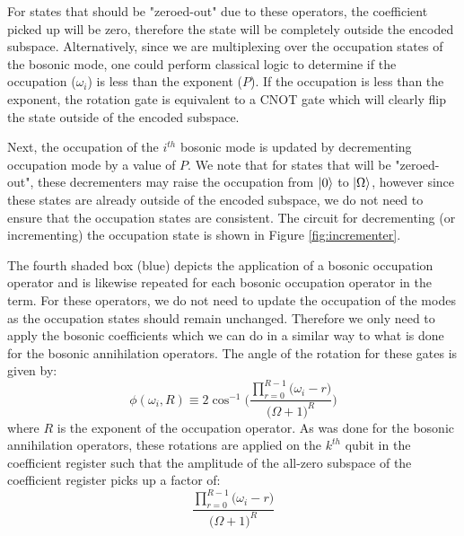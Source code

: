 For states that should be "zeroed-out" due to these operators, the coefficient picked up will be zero, therefore the state will be completely outside the encoded subspace.
Alternatively, since we are multiplexing over the occupation states of the bosonic mode, one could perform classical logic to determine if the occupation ($\omega_i$) is less than the exponent ($P$).
If the occupation is less than the exponent, the rotation gate is equivalent to a CNOT gate which will clearly flip the state outside of the encoded subspace.

Next, the occupation of the $i^{th}$ bosonic mode is updated by decrementing occupation mode by a value of $P$.
We note that for states that will be "zeroed-out", these decrementers may raise the occupation from $\ket{0}$ to $\ket{\Omega}$, however since these states are already outside of the encoded subspace, we do not need to ensure that the occupation states are consistent.
The circuit for decrementing (or incrementing) the occupation state is shown in Figure \ref{fig:incrementer}.

The fourth shaded box (blue) depicts the application of a bosonic occupation operator and is likewise repeated for each bosonic occupation operator in the term.
For these operators, we do not need to update the occupation of the modes as the occupation states should remain unchanged.
Therefore we only need to apply the bosonic coefficients which we can do in a similar way to what is done for the bosonic annihilation operators. 
The angle of the rotation for these gates is given by:
\begin{equation}
    \phi(\omega_i, R) \equiv 2 \cos^{-1}{\Big(\frac{\prod_{r=0}^{R-1} \big(\omega_i - r \big)}{\big(\Omega + 1\big)^R}\Big)}
\end{equation}
where $R$ is the exponent of the occupation operator.
As was done for the bosonic annihilation operators, these rotations are applied on the $k^{th}$ qubit in the coefficient register such that the amplitude of the all-zero subspace of the coefficient register picks up a factor of:
\begin{equation}
    \frac{\prod_{r=0}^{R-1} \big(\omega_i - r \big)}{\big(\Omega + 1\big)^R}
\end{equation}

